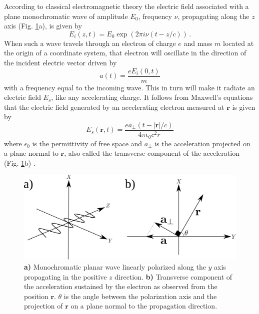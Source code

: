 According to classical electromagnetic theory the electric field associated with a plane monochromatic wave of
amplitude $E_0$, frequency $\nu$, propagating along the $z$ axis
(Fig. \ref{coordinate_axis}a), is given by
\begin{equation}
E_i(z,t) = E_0 \exp(2 \pi i \nu (t-z/c)) \, .
\label{Eq:wave_propagation}
\end{equation}
When such a wave travels through an electron of charge $e$ and mass $m$ located at the origin of a coordinate
system, that electron will oscillate in the direction of the incident electric 
vector driven by
\begin{equation}
a(t) = \frac{e E_i(0,t)}{m}
\label{Eq:electron_acceleration}
\end{equation}
with a frequency equal to the incoming wave. This in turn will make it radiate
an electric field $E_s$, like any accelerating charge. It follows from Maxwell's
equations that the electric field generated by an accelerating electron measured
at $\mathbf r$ is given by
\begin{equation}
E_s( \mathbf r,t) = \frac{e a_{\perp}(t - |\mathbf r|/c)}{4 \pi \epsilon_0 c^2 r}
\label{Eq:scattering_by_accelerating_charge}
\end{equation}
where  $\epsilon_0$ is the permittivity of free space and $a_{\perp}$ is the
acceleration projected on a plane normal to $\mathbf r$, also called the
transverse component of the acceleration (Fig. \ref{coordinate_axis}b) \cite{Attwood2007Soft}. 
\begin{figure}[h]
\centering
\includegraphics[width=1 \columnwidth]{Diffraction_Theory/coordinate_acceleration.png}
\caption{{\bf a)} Monochromatic planar wave linearly polarized along the $y$ axis
  propagating in the positive $z$ direction. {\bf b)} Transverse component of the
  acceleration sustained by the electron as observed from the position ${\mathbf r}$. $\theta$ is the angle between the polarization axis and the projection of $\mathbf r$ on a plane normal to the propagation direction.}
\label{coordinate_axis}
\end{figure}
